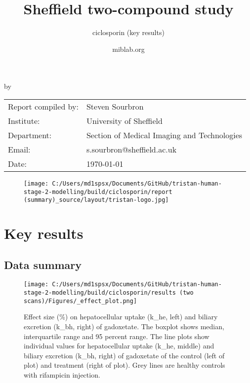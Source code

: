 \documentclass{epflreport}%
\begin{document}
%
\normalsize%
\frontmatter%
\title{Sheffield two{-}compound study}%
\subtitle{ciclosporin (key results)}%
\author{miblab.org}%
\subject{D2.13 {-} Internal report}%
%
%
%
\makecover%
\begin{titlepage}%
\begin{center}%
\makeatletter%
\largetitlestyle\fontsize{45}{45}\selectfont\@title%
\makeatother%
\linebreak%
\makeatletter%
\ifdefvoid{\@subtitle}{}{\bigskip\titlestyle\fontsize{20}{20}\selectfont\@subtitle}%
\makeatother%
\linebreak%
\bigskip%
\bigskip%
by%
\linebreak%
\bigskip%
\bigskip%
\makeatletter%
\largetitlestyle\fontsize{25}{25}\selectfont\@author%
\makeatother%
\vfill%
\large%
\begin{tabular}{ll}%
\hline%
Report compiled by: &Steven Sourbron\\%
Institute: &University of Sheffield\\%
Department: &Section of Medical Imaging and Technologies\\%
Email: &s.sourbron@sheffield.ac.uk\\%
Date: &\today\\%
\hline%
\end{tabular}%


\begin{figure}[b!]%
\centering%
\centering%
\texttt{[image: C:/Users/md1spsx/Documents/GitHub/tristan-human-stage-2-modelling/build/ciclosporin/report (summary)\_source/layout/tristan-logo.jpg]}%
\end{figure}

%
\end{center}%
\end{titlepage}%
\newpage%
\tableofcontents%
\mainmatter%
\clearpage%
\chapter{Key results}%
\section{Data summary}%
\label{sec:Datasummary}%

%


\begin{figure}[h!]%
\centering%
\texttt{[image: C:/Users/md1spsx/Documents/GitHub/tristan-human-stage-2-modelling/build/ciclosporin/results (two scans)/Figures/\_effect\_plot.png]}%
\caption{Effect size (\%) on hepatocellular uptake (k\_he, left) and biliary excretion (k\_bh, right) of gadoxetate. The boxplot shows median, interquartile range and 95 percent range. The line plots show individual values for hepatocellular uptake (k\_he, middle) and biliary excretion (k\_bh, right) of gadoxetate of the control (left of plot) and treatment (right of plot). Grey lines are healthy controls with rifampicin injection.}%
\end{figure}
\end{document}
